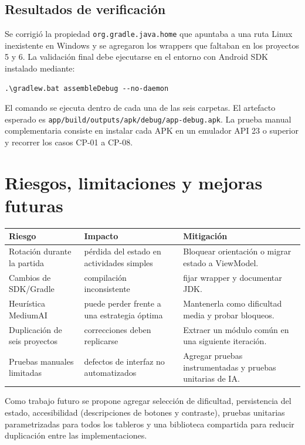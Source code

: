 \documentclass[stu,a4paper,12pt,floatsintext]{apa7}
\begin{document}
\subsection{Resultados de verificación}
Se corrigió la propiedad \texttt{org.gradle.java.home} que apuntaba a una
ruta Linux inexistente en Windows y se agregaron los wrappers que faltaban en
los proyectos 5 y 6. La validación final debe ejecutarse en el entorno con
Android SDK instalado mediante:

\begin{lstlisting}[basicstyle=\ttfamily\small,frame=single]
.\gradlew.bat assembleDebug --no-daemon
\end{lstlisting}

El comando se ejecuta dentro de cada una de las seis carpetas. El artefacto
esperado es \texttt{app/build/outputs/apk/debug/app-debug.apk}. La prueba
manual complementaria consiste en instalar cada APK en un emulador API 23 o
superior y recorrer los casos CP-01 a CP-08.

\section{Riesgos, limitaciones y mejoras futuras}
\begin{longtable}{p{}p{}p{}}
\toprule
\textbf{Riesgo} & \textbf{Impacto} & \textbf{Mitigación}\\
\midrule
Rotación durante la partida & pérdida del estado en actividades simples &
Bloquear orientación o migrar estado a ViewModel.\\
Cambios de SDK/Gradle & compilación inconsistente & fijar wrapper y documentar JDK.\\
Heurística MediumAI & puede perder frente a una estrategia óptima &
Mantenerla como dificultad media y probar bloqueos.\\
Duplicación de seis proyectos & correcciones deben replicarse &
Extraer un módulo común en una siguiente iteración.\\
Pruebas manuales limitadas & defectos de interfaz no automatizados &
Agregar pruebas instrumentadas y pruebas unitarias de IA.\\
\bottomrule
\end{longtable}

Como trabajo futuro se propone agregar selección de dificultad, persistencia
del estado, accesibilidad (descripciones de botones y contraste), pruebas
unitarias parametrizadas para todos los tableros y una biblioteca compartida
para reducir duplicación entre las implementaciones.
\end{document}
